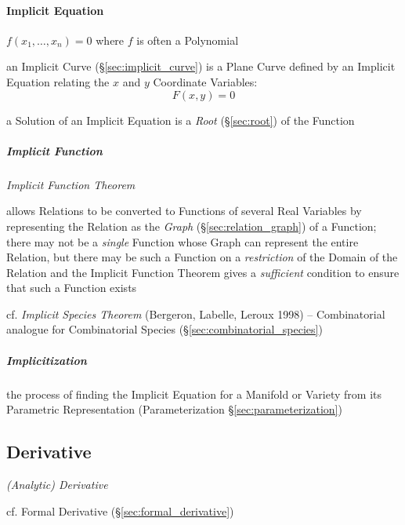 {\paragraph{Implicit Equation}\label{sec:implicit_equation}\hfill


$f(x_1, \ldots, x_n) = 0$ where $f$ is often a Polynomial

\fist an Implicit Curve (\S\ref{sec:implicit_curve}) is a Plane Curve defined by
an Implicit Equation relating the $x$ and $y$ Coordinate Variables:
\[
  F(x,y) = 0
\]

a Solution of an Implicit Equation is a \emph{Root} (\S\ref{sec:root}) of the
Function



\subparagraph{Implicit Function}\label{sec:implicit_function}\hfill

\emph{Implicit Function Theorem}

allows Relations to be converted to Functions of several Real Variables by
representing the Relation as the \emph{Graph} (\S\ref{sec:relation_graph}) of a
Function; there may not be a \emph{single} Function whose Graph can represent
the entire Relation, but there may be such a Function on a \emph{restriction} of
the Domain of the Relation and the Implicit Function Theorem gives a
\emph{sufficient} condition to ensure that such a Function exists

cf. \emph{Implicit Species Theorem} (Bergeron, Labelle, Leroux 1998) --
Combinatorial analogue for Combinatorial Species
(\S\ref{sec:combinatorial_species})



\subparagraph{Implicitization}\label{sec:implicitization}\hfill

the process of finding the Implicit Equation for a Manifold or Variety from its
Parametric Representation (Parameterization \S\ref{sec:parameterization})



\subsection{Derivative}\label{sec:derivative}

\emph{(Analytic) Derivative}

\fist cf. Formal Derivative (\S\ref{sec:formal_derivative})

}
